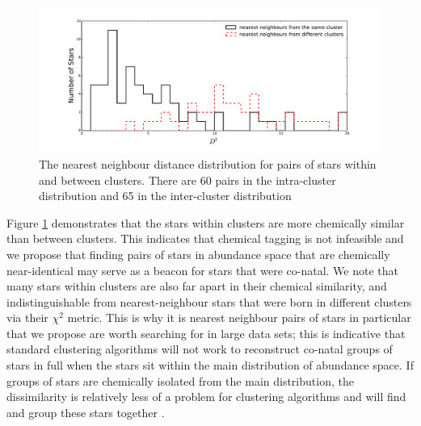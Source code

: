 \documentclass[14pt, preprint2]{aastex6}
\begin{document}
\begin{figure}%
\centering
\includegraphics[scale=0.4]{chi2red.pdf} 
  \caption{The nearest neighbour distance distribution for pairs of stars within and between clusters. There are 60 pairs in the intra-cluster distribution and 65 in the inter-cluster distribution}
\label{fig:chi2}
\end{figure}


Figure \ref{fig:chi2} demonstrates that the stars within clusters are more chemically similar than between clusters. This indicates that chemical tagging is not infeasible and we propose that finding pairs of stars in abundance space that are chemically near-identical may serve as a beacon for stars that were co-natal.  We note that many stars within clusters are also far apart in their chemical similarity, and indistinguishable from nearest-neighbour stars that were born in different clusters via their $\chi^2$ metric. This is why it is nearest neighbour pairs of stars in particular that we propose are worth searching for in large data sets; this is indicative that standard clustering algorithms will not work to reconstruct co-natal groups of stars in full when the stars sit within the main distribution of abundance space. If groups of stars are chemically isolated from the main distribution, the dissimilarity is relatively less of a problem for clustering algorithms and will find and group these stars together \citep[see][for success of chemical tagging of targeted metal-poor globular clusters]{Hogg2016}.




\end{document}
